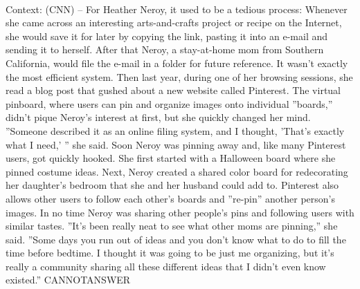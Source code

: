 \documentclass[11pt,a4paper, onecolumn]{article}
\begin{document}
\\ Context: (CNN) -- For Heather Neroy, it used to be a tedious process: Whenever she came across an interesting arts-and-crafts project or recipe on the Internet, she would save it for later by copying the link, pasting it into an e-mail and sending it to herself. After that Neroy, a stay-at-home mom from Southern California, would file the e-mail in a folder for future reference. It wasn't exactly the most efficient system. Then last year, during one of her browsing sessions, she read a blog post that gushed about a new website called Pinterest. The virtual pinboard, where users can pin and organize images onto individual ''boards,'' didn't pique Neroy's interest at first, but she quickly changed her mind. ''Someone described it as an online filing system, and I thought, 'That's exactly what I need,' '' she said. Soon Neroy was pinning away and, like many Pinterest users, got quickly hooked. She first started with a Halloween board where she pinned costume ideas. Next, Neroy created a shared color board for redecorating her daughter's bedroom that she and her husband could add to. Pinterest also allows other users to follow each other's boards and ''re-pin'' another person's images. In no time Neroy was sharing other people's pins and following users with similar tastes. ''It's been really neat to see what other moms are pinning,'' she said. ''Some days you run out of ideas and you don't know what to do to fill the time before bedtime. I thought it was going to be just me organizing, but it's really a community sharing all these different ideas that I didn't even know existed.'' CANNOTANSWER
\end{document}
